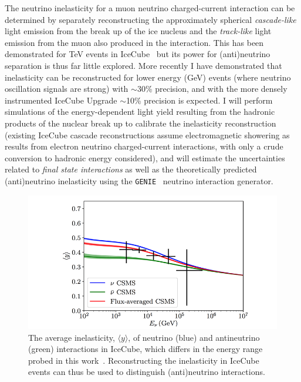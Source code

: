 \documentclass[a4paper,11pt]{article}
\begin{document}
The neutrino inelasticity for a muon neutrino charged-current interaction can be determined by separately reconstructing the approximately spherical \textit{cascade-like} light emission from the break up of the ice nucleus and the \textit{track-like} light emission from the muon also produced in the interaction. This has been demonstrated for TeV events in IceCube~\cite{Aartsen:2018vez} but its power for (anti)neutrino separation is thus far little explored. More recently I have demonstrated that inelasticity can be reconstructed for lower energy (GeV) events (where neutrino oscillation signals are strong) with $\sim$30\% precision, and with the more densely instrumented IceCube Upgrade $\sim$10\% precision is expected. I will perform simulations of the energy-dependent light yield resulting from the hadronic products of the nuclear break up to calibrate the inelasticity reconstruction (existing IceCube cascade reconstructions assume electromagnetic showering as results from electron neutrino charged-current interactions, with only a crude conversion to hadronic energy considered), and will estimate the uncertainties related to \textit{final state interactions} as well as the theoretically predicted (anti)neutrino inelasticity using the \texttt{GENIE}~\cite{Andreopoulos:2009zz} neutrino interaction generator.


\begin{figure} %
    \centering
    \includegraphics[trim=2.0cm 0.0cm 1.0cm 0.0cm, clip=true, width=\linewidth]{images/inelasticity.png}
    \caption{The average inelasticity, $\langle y \rangle$, of neutrino (blue) and antineutrino (green) interactions in IceCube, which differs in the energy range probed in this work~\cite{Aartsen:2018vez}. Reconstructing the inelasticity in IceCube events can thus be used to distinguish (anti)neutrino interactions.}
    \label{fig:inelasticity}
\end{figure}
\end{document}
